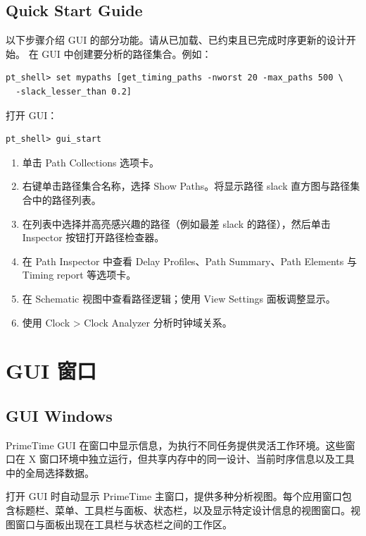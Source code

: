 \subsection*{Quick Start Guide}

以下步骤介绍 GUI 的部分功能。请从已加载、已约束且已完成时序更新的设计开始。
在 GUI 中创建要分析的路径集合。例如：
\begin{lstlisting}
pt_shell> set mypaths [get_timing_paths -nworst 20 -max_paths 500 \
  -slack_lesser_than 0.2]
\end{lstlisting}

打开 GUI：
\begin{lstlisting}
pt_shell> gui_start
\end{lstlisting}

\begin{enumerate}
  \item 单击 Path Collections 选项卡。
  \item 右键单击路径集合名称，选择 Show Paths。将显示路径 slack 直方图与路径集合中的路径列表。
  \item 在列表中选择并高亮感兴趣的路径（例如最差 slack 的路径），然后单击 Inspector 按钮打开路径检查器。
  \item 在 Path Inspector 中查看 Delay Profiles、Path Summary、Path Elements 与 Timing report 等选项卡。
  \item 在 Schematic 视图中查看路径逻辑；使用 View Settings 面板调整显示。
  \item 使用 Clock > Clock Analyzer 分析时钟域关系。
\end{enumerate}


\section{GUI 窗口}
\subsection*{GUI Windows}

PrimeTime GUI 在窗口中显示信息，为执行不同任务提供灵活工作环境。这些窗口在 X 窗口环境中独立运行，但共享内存中的同一设计、当前时序信息以及工具中的全局选择数据。

打开 GUI 时自动显示 PrimeTime 主窗口，提供多种分析视图。每个应用窗口包含标题栏、菜单、工具栏与面板、状态栏，以及显示特定设计信息的视图窗口。视图窗口与面板出现在工具栏与状态栏之间的工作区。


